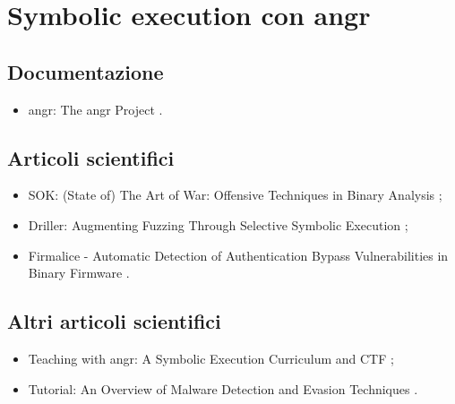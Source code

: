 \section*{Symbolic execution con angr}

\subsection*{Documentazione}
\begin{itemize}

\item angr: The angr Project \cite{angr9.2.90doc}.

\end{itemize}

\subsection*{Articoli scientifici}
\begin{itemize}

\item SOK: (State of) The Art of War: Offensive Techniques in Binary Analysis \cite{shoshitaishvili2016angr};

\item Driller: Augmenting Fuzzing Through Selective Symbolic Execution \cite{stephens2016driller};

\item Firmalice - Automatic Detection of Authentication Bypass Vulnerabilities in Binary Firmware \cite{shoshitaishvili2015firmlice}.

\end{itemize}

\subsection*{Altri articoli scientifici}
\begin{itemize}

\item Teaching with angr: A Symbolic Execution Curriculum and CTF \cite{springer2018teaching};

\item Tutorial: An Overview of Malware Detection and Evasion Techniques \cite{biondi2018tutorial}.

\end{itemize}

